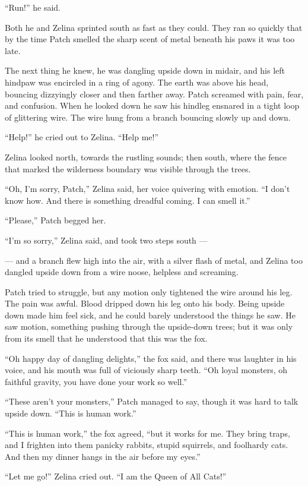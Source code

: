 \documentclass[ebook,oneside,openany,12pt]{memoir}
\begin{document}
“Run!” he said.

Both he and Zelina sprinted south as fast as they could. They ran so
quickly that by the time Patch smelled the sharp scent of metal
beneath his paws it was too late.

The next thing he knew, he was dangling upside down in midair, and his
left hindpaw was encircled in a ring of agony. The earth was above his
head, bouncing dizzyingly closer and then farther away. Patch screamed
with pain, fear, and confusion. When he looked down he saw his hindleg
ensnared in a tight loop of glittering wire. The wire hung from a
branch bouncing slowly up and down.

“Help!” he cried out to Zelina. “Help me!”

Zelina looked north, towards the rustling sounds; then south, where
the fence that marked the wilderness boundary was visible through the
trees.

“Oh, I’m sorry, Patch,” Zelina said, her voice quivering with
emotion. “I don’t know how. And there is something dreadful coming. I
can smell it.”

“Please,” Patch begged her.

“I’m so sorry,” Zelina said, and took two steps south —

— and a branch flew high into the air, with a silver flash of metal,
and Zelina too dangled upside down from a wire noose, helpless and
screaming.

Patch tried to struggle, but any motion only tightened the wire around
his leg. The pain was awful. Blood dripped down his leg onto his
body. Being upside down made him feel sick, and he could barely
understood the things he saw. He saw motion, something pushing through
the upside-down trees; but it was only from its smell that he
understood that this was the fox.

“Oh happy day of dangling delights,” the fox said, and there was
laughter in his voice, and his mouth was full of viciously sharp
teeth. “Oh loyal monsters, oh faithful gravity, you have done your
work so well.”

“These aren’t your monsters,” Patch managed to say, though it was hard
to talk upside down. “This is human work.”

“This is human work,” the fox agreed, “but it works for me. They bring
traps, and I frighten into them panicky rabbits, stupid squirrels, and
foolhardy cats. And then my dinner hangs in the air before my eyes.”

“Let me go!” Zelina cried out. “I am the Queen of All Cats!”
\end{document}
